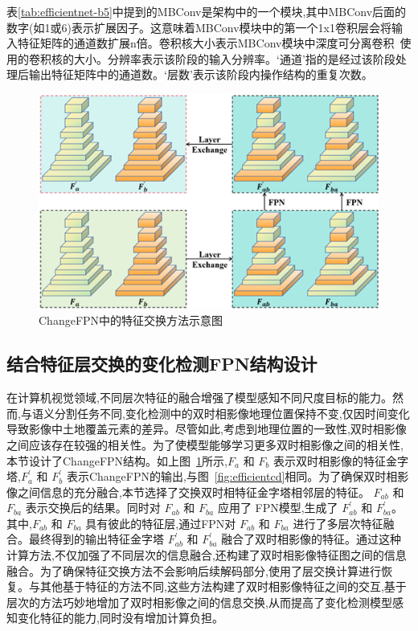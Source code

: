 表\ref{tab:efficientnet-b5}中提到的MBConv是架构中的一个模块,其中MBConv后面的数字(如1或6)表示扩展因子。这意味着MBConv模块中的第一个1x1卷积层会将输入特征矩阵的通道数扩展n倍。卷积核大小表示MBConv模块中深度可分离卷积~\cite{Chollet2016XceptionDL}使用的卷积核的大小。分辨率表示该阶段的输入分辨率。‘通道’指的是经过该阶段处理后输出特征矩阵中的通道数。‘层数’表示该阶段内操作结构的重复次数。

\begin{figure}[!htb]
  \centering
  \includegraphics[width=\textwidth]{paper_figures/基于双时相遥感影像特征交互的变化检测算法研究/EfficientCD/efficientcd_changefpn.png}
  \caption{ChangeFPN中的特征交换方法示意图}
  \label{fig:efficientcd_changefpn}
\end{figure}

\subsection{结合特征层交换的变化检测FPN结构设计}

在计算机视觉领域,不同层次特征的融合增强了模型感知不同尺度目标的能力。然而,与语义分割任务不同,变化检测中的双时相影像地理位置保持不变,仅因时间变化导致影像中土地覆盖元素的差异。尽管如此,考虑到地理位置的一致性,双时相影像之间应该存在较强的相关性。为了使模型能够学习更多双时相影像之间的相关性,本节设计了ChangeFPN结构。如上图~\ref{fig:efficientcd_changefpn}所示,$F_{a}$ 和 $F_{b}$ 表示双时相影像的特征金字塔,${F}_{a}^{\prime}$ 和 ${F}_{b}^{\prime}$ 表示ChangeFPN的输出,与图~\ref{fig:efficientcd}相同。为了确保双时相影像之间信息的充分融合,本节选择了交换双时相特征金字塔相邻层的特征。 $F_{ab}$ 和 $F_{ba}$ 表示交换后的结果。同时对 $F_{ab}$ 和 $F_{ba}$ 应用了 FPN模型,生成了 ${F}_{ab}^{\prime}$ 和 ${F}_{ba}^{\prime}$。其中,$F_{ab}$ 和 $F_{ba}$ 具有彼此的特征层,通过FPN对 $F_{ab}$ 和 $F_{ba}$ 进行了多层次特征融合。最终得到的输出特征金字塔 ${F}_{ab}^{\prime}$ 和 ${F}_{ba}^{\prime}$ 融合了双时相影像的特征。通过这种计算方法,不仅加强了不同层次的信息融合,还构建了双时相影像特征图之间的信息融合。为了确保特征交换方法不会影响后续解码部分,使用了层交换计算进行恢复。与其他基于特征的方法不同,这些方法构建了双时相影像特征之间的交互,基于层次的方法巧妙地增加了双时相影像之间的信息交换,从而提高了变化检测模型感知变化特征的能力,同时没有增加计算负担。

